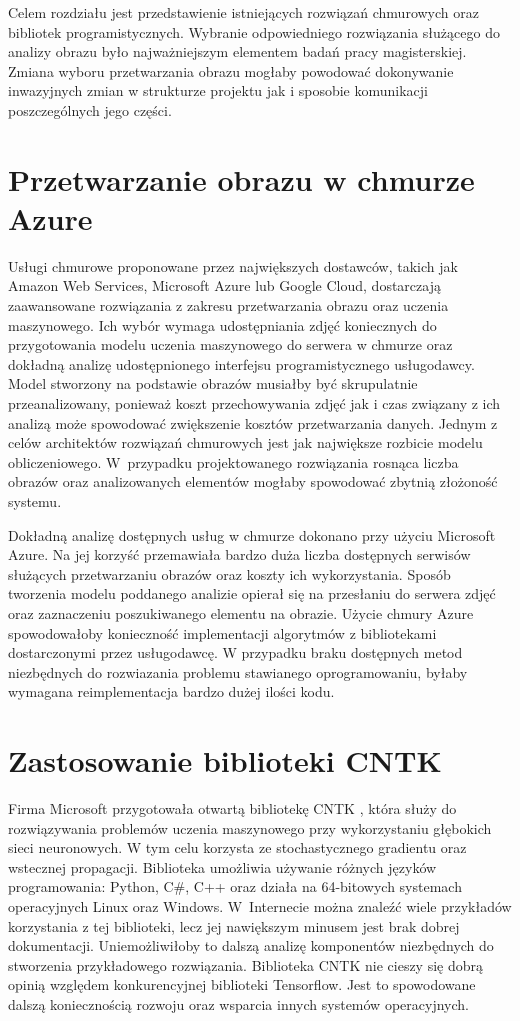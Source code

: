 Celem rozdziału jest przedstawienie istniejących rozwiązań chmurowych oraz bibliotek programistycznych. Wybranie odpowiedniego rozwiązania służącego do analizy obrazu było najważniejszym elementem badań pracy magisterskiej. Zmiana wyboru przetwarzania obrazu mogłaby powodować dokonywanie inwazyjnych zmian w strukturze projektu jak i sposobie komunikacji poszczególnych jego części. 

\section{Przetwarzanie obrazu w chmurze Azure} {
Usługi chmurowe proponowane przez największych dostawców, takich jak Amazon Web Services, Microsoft Azure lub Google Cloud, dostarczają zaawansowane rozwiązania z zakresu przetwarzania obrazu oraz uczenia maszynowego. Ich wybór wymaga udostępniania zdjęć koniecznych do przygotowania modelu uczenia maszynowego do serwera w chmurze oraz dokładną analizę udostępnionego interfejsu programistycznego usługodawcy. Model stworzony na podstawie obrazów musiałby być skrupulatnie przeanalizowany, ponieważ koszt przechowywania zdjęć jak i czas związany z ich analizą może spowodować zwiększenie kosztów przetwarzania danych. Jednym z celów architektów rozwiązań chmurowych jest jak największe rozbicie modelu obliczeniowego. W~przypadku projektowanego rozwiązania rosnąca liczba obrazów oraz analizowanych elementów mogłaby spowodować zbytnią złożoność systemu. 

Dokładną analizę dostępnych usług w chmurze dokonano przy użyciu Microsoft Azure. Na jej korzyść przemawiała bardzo duża liczba dostępnych serwisów służących przetwarzaniu obrazów oraz koszty ich wykorzystania. Sposób tworzenia modelu poddanego analizie opierał się na przesłaniu do serwera zdjęć oraz zaznaczeniu poszukiwanego elementu na obrazie. Użycie chmury Azure spowodowałoby konieczność implementacji algorytmów z bibliotekami dostarczonymi przez usługodawcę. W przypadku braku dostępnych metod niezbędnych do rozwiazania problemu stawianego oprogramowaniu, byłaby wymagana reimplementacja bardzo dużej ilości kodu. 

\section{Zastosowanie biblioteki CNTK}{
Firma Microsoft przygotowała otwartą bibliotekę CNTK \cite{CNTK}, która służy do rozwiązywania problemów uczenia maszynowego przy wykorzystaniu głębokich sieci neuronowych. W tym celu korzysta ze stochastycznego gradientu oraz wstecznej propagacji. Biblioteka umożliwia używanie różnych języków programowania: Python, C\#, C++ oraz działa na 64-bitowych systemach operacyjnych Linux oraz Windows. W~Internecie można znaleźć wiele przykładów korzystania z tej biblioteki, lecz jej nawiększym minusem jest brak dobrej dokumentacji. Uniemożliwiłoby to dalszą analizę komponentów niezbędnych do stworzenia przykładowego rozwiązania. Biblioteka CNTK nie cieszy się dobrą opinią względem konkurencyjnej biblioteki Tensorflow. Jest to spowodowane dalszą koniecznością rozwoju oraz wsparcia innych systemów operacyjnych. 
}

}
